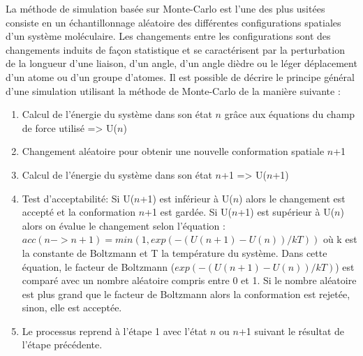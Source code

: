 
La méthode de simulation basée sur Monte-Carlo est l'une des plus usitées \cite{metropolis1949monte} consiste en un échantillonnage aléatoire des différentes configurations spatiales d'un système moléculaire. Les changements entre les configurations sont des changements induits de façon statistique et se caractérisent par la perturbation de la longueur d'une liaison, d'un angle, d'un angle dièdre ou le léger déplacement d'un atome ou d'un groupe d'atomes. 
Il est possible de décrire le principe général d'une simulation utilisant la méthode de Monte-Carlo de la manière suivante :

\begin{enumerate}
  \item Calcul de l'énergie du système dans son état $n$ grâce aux équations du champ de force utilisé => U($n$)
  \item Changement aléatoire pour obtenir une nouvelle conformation spatiale $n$+1
  \item Calcul de l'énergie du système dans son état $n$+1 => U($n$+1)
  \item Test d'acceptabilité: 
  Si U($n$+1) est inférieur à U($n$) alors le changement est accepté et la conformation $n$+1 est gardée. 
  Si U($n$+1) est supérieur à U($n$) alors on évalue le changement selon l'équation : $acc(n -> n+1) = min(1, exp(-(U(n+1)-U(n))/kT))$ où k est la constante de Boltzmann et T la température du système. Dans cette équation, le facteur de Boltzmann ($exp(-(U(n+1)-U(n))/kT)$) est comparé avec un nombre aléatoire compris entre 0 et 1. Si le nombre aléatoire est plus grand que le facteur de Boltzmann alors la conformation est rejetée, sinon, elle est acceptée.
  \item Le processus reprend à l'étape 1 avec l'état $n$ ou $n$+1 suivant le résultat de l'étape précédente.
\end{enumerate}





